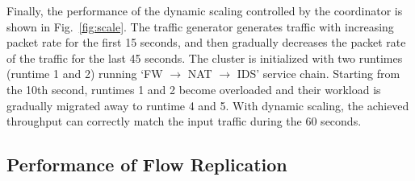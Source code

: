 Finally, the performance of the dynamic scaling controlled by the coordinator is shown in Fig.~\ref{fig:scale}. The traffic generator generates traffic with increasing packet rate for the first 15 seconds, and then gradually decreases the packet rate of the traffic for the last 45 seconds. %
The cluster is initialized with two runtimes (runtime 1 and 2) running `FW $\rightarrow$ NAT $\rightarrow$ IDS' service chain. Starting from the 10th second, runtimes 1 and 2 become overloaded and their workload is gradually migrated away to runtime 4 and 5. With dynamic scaling, the achieved throughput can correctly match the input traffic during the 60 seconds.

\subsection{Performance of Flow Replication}
\label{sec:rp}

